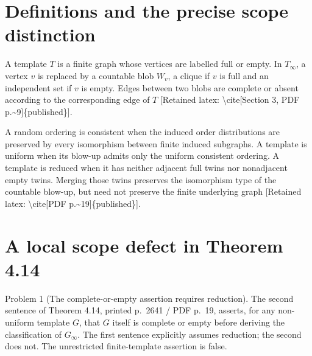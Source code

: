 \documentclass[10pt]{article}
\begin{document}
\section*{Definitions and the precise scope distinction}
A template \(T\) is a finite graph whose vertices are labelled full or empty. In \(T_\infty\), a vertex \(v\) is replaced by a countable blob \(W_v\), a clique if \(v\) is full and an independent set if \(v\) is empty. Edges between two blobs are complete or absent according to the corresponding edge of \(T\) [Retained latex: \textbackslash{}cite[Section 3, PDF p.\textasciitilde{}9]\{published\}].\par
A random ordering is consistent when the induced order distributions are preserved by every isomorphism between finite induced subgraphs. A template is uniform when its blow-up admits only the uniform consistent ordering. A template is reduced when it has neither adjacent full twins nor nonadjacent empty twins. Merging those twins preserves the isomorphism type of the countable blow-up, but need not preserve the finite underlying graph [Retained latex: \textbackslash{}cite[PDF p.\textasciitilde{}19]\{published\}].\par
\section*{A local scope defect in Theorem 4.14}
Problem 1 (The complete-or-empty assertion requires reduction).  The second sentence of Theorem 4.14, printed p. 2641 / PDF p. 19, asserts, for any non-uniform template \(G\), that \(G\) itself is complete or empty before deriving the classification of \(G_\infty\). The first sentence explicitly assumes reduction; the second does not. The unrestricted finite-template assertion is false.\par
\end{document}

